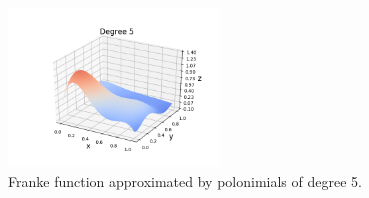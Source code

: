\documentclass[reprint,english,notitlepage]{revtex4-1}  %
\begin{document}
\begin{figure}[h]
    \centering
    \includegraphics[width=0.50\textwidth]{OLS_deg5.png}
    \caption{Franke function approximated by polonimials of degree 5.}
    \label{ols: 5}
\end{figure}
\end{document}
